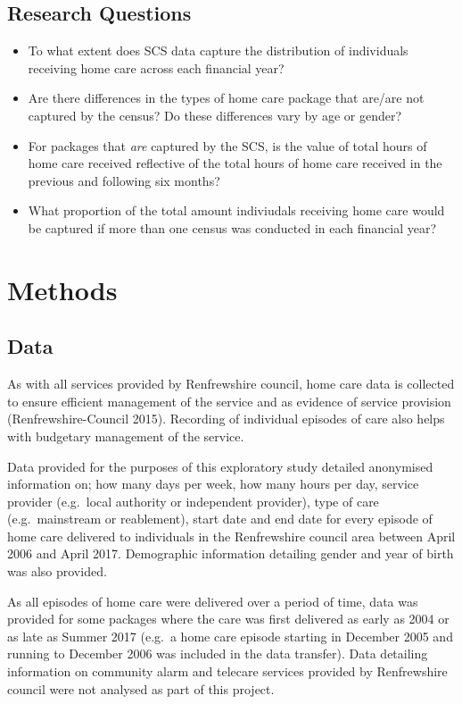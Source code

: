 \documentclass[]{article}
\begin{document}
\FloatBarrier
\subsection{Research Questions}\label{subsec:renfrew-qs}

\begin{itemize}[noitemsep]
\item To what extent does SCS data capture the distribution of individuals receiving home care across each financial year?
\item Are there differences in the types of home care package that are/are not captured by the census? Do these differences vary by age or gender?
\item For packages that \emph{are} captured by the SCS, is the value of total hours of home care received reflective of the total hours of home care received in the previous and following six months?
\item What proportion of the total amount indiviudals receiving home care would be captured if more than one census was conducted in each financial year?
\end{itemize}

\section{Methods}\label{sec:renf-methods}

\subsection{Data}\label{subsec:renf-methods-data}

As with all services provided by Renfrewshire council, home care data is
collected to ensure efficient management of the service and as evidence
of service provision (Renfrewshire-Council 2015). Recording of
individual episodes of care also helps with budgetary management of the
service.

Data provided for the purposes of this exploratory study detailed
anonymised information on; how many days per week, how many hours per
day, service provider (e.g.~local authority or independent provider),
type of care (e.g.~mainstream or reablement), start date and end date
for every episode of home care delivered to individuals in the
Renfrewshire council area between April 2006 and April 2017. Demographic
information detailing gender and year of birth was also provided.

As all episodes of home care were delivered over a period of time, data
was provided for some packages where the care was first delivered as
early as 2004 or as late as Summer 2017 (e.g.~a home care episode
starting in December 2005 and running to December 2006 was included in
the data transfer). Data detailing information on community alarm and
telecare services provided by Renfrewshire council were not analysed as
part of this project.
\end{document}
